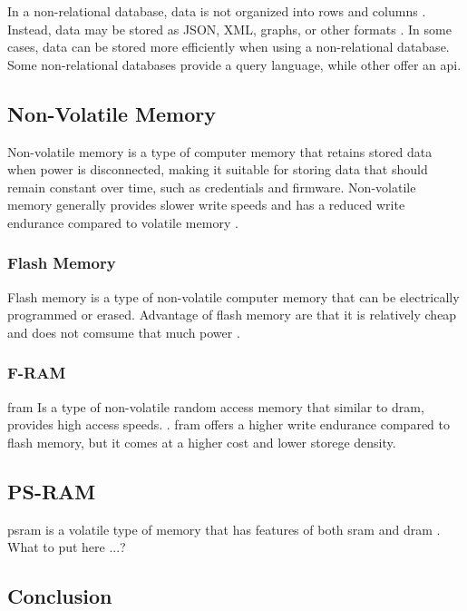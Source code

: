 \documentclass{article}
\begin{document}
In a non-relational database, data is not organized into rows and columns \cite{microsoft-nrd}.
Instead, data may be stored as JSON, XML, graphs, or other formats \cite{microsoft-nrd}.
In some cases, data can be stored more efficiently when using a non-relational database.
Some non-relational databases provide a query language, while other offer an \gls{api}.

\subsection{Non-Volatile Memory}

Non-volatile memory is a type of computer memory that retains stored data when power is disconnected, making it suitable for storing data that should remain constant over time, such as credentials and firmware.
Non-volatile memory generally provides slower write speeds and has a reduced write endurance compared to volatile memory \cite{cintra-2013}.

\subsubsection{Flash Memory}

Flash memory is a type of non-volatile computer memory that can be electrically programmed or erased.
Advantage of flash memory are that it is relatively cheap and does not comsume that much power \cite{yasar-2023}.

\subsubsection{F-RAM}

\gls{fram} Is a type of non-volatile random access memory that similar to \gls{dram}, provides high access speeds. \cite{electronic-notes-fram}.
\gls{fram} offers a higher write endurance compared to flash memory, but it comes at a higher cost and lower storege density.

\subsection{PS-RAM}

\gls{psram} is a volatile type of memory that has features of both \gls{sram} and \gls{dram} \cite{winbond-psram}. What to put here ...?

\subsection{Conclusion}
\end{document}
